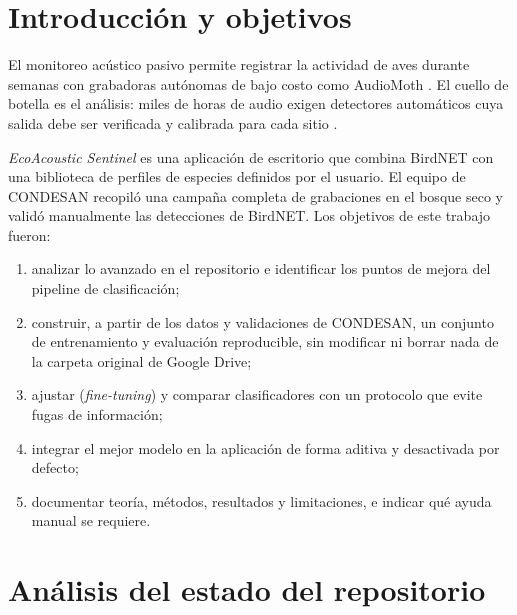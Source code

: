 \documentclass[11pt,a4paper]{article}
\begin{document}
\tableofcontents
\newpage

\section{Introducción y objetivos}
El monitoreo acústico pasivo permite registrar la actividad de aves durante semanas con grabadoras autónomas de bajo costo
como AudioMoth \citep{hill2018audiomoth,gibb2019passive}. El cuello de botella es el análisis: miles de horas de audio exigen
detectores automáticos cuya salida debe ser verificada y calibrada para cada sitio \citep{stowell2022review,wood2024guidelines}.

\textit{EcoAcoustic Sentinel} es una aplicación de escritorio que combina BirdNET \citep{kahl2021birdnet} con una biblioteca
de perfiles de especies definidos por el usuario. El equipo de CONDESAN recopiló una campaña completa de grabaciones en el
bosque seco y validó manualmente las detecciones de BirdNET. Los objetivos de este trabajo fueron:
\begin{enumerate}
  \item analizar lo avanzado en el repositorio e identificar los puntos de mejora del pipeline de clasificación;
  \item construir, a partir de los datos y validaciones de CONDESAN, un conjunto de entrenamiento y evaluación reproducible,
        sin modificar ni borrar nada de la carpeta original de Google Drive;
  \item ajustar (\emph{fine-tuning}) y comparar clasificadores con un protocolo que evite fugas de información;
  \item integrar el mejor modelo en la aplicación de forma aditiva y desactivada por defecto;
  \item documentar teoría, métodos, resultados y limitaciones, e indicar qué ayuda manual se requiere.
\end{enumerate}

\section{Análisis del estado del repositorio}
\end{document}
